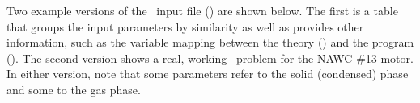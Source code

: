 \setcounter{figure}{0}
\setcounter{table}{0}
\setcounter{equation}{0}


Two example versions of the \Rocburn\ input file () are shown below. The first is a table that groups the input parameters by similarity as well as provides other information, such as the variable mapping between the theory () and the program (). The second version shows a real, working \Rocburn\ problem for the NAWC \#13 motor. In either version, note that some parameters refer to the solid (condensed) phase and some to the gas phase.

\newpage



